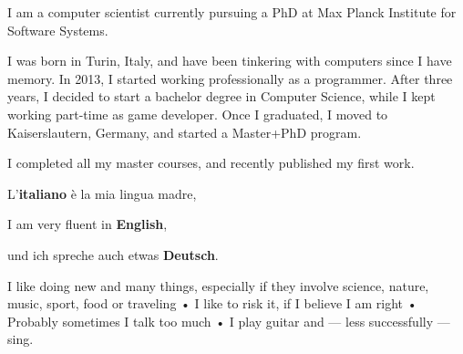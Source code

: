 


I am a computer scientist currently pursuing a PhD at Max Planck Institute for Software Systems. 

I was born in Turin, Italy, and have been tinkering with computers since I have memory. In 2013, I started working professionally as a programmer. After three years, I decided to start a bachelor degree in Computer Science, while I kept working part-time as game developer. Once I graduated, I moved to Kaiserslautern, Germany, and started a Master+PhD program.

I completed all my master courses, and recently published my first work.


L'\textbf{italiano} è la mia lingua madre,

I am very fluent in \textbf{English},

und ich spreche auch etwas \textbf{Deutsch}.


I like doing new and many things, especially if they involve science, nature, music, sport, food or traveling • I like to risk it, if I believe I am right • Probably sometimes I talk too much • I play guitar and --- less successfully --- sing.


